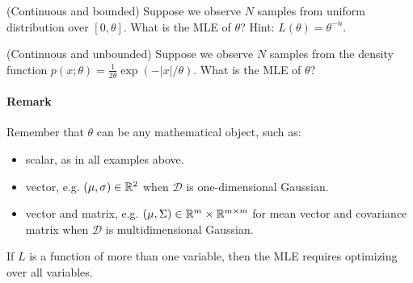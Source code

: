 \documentclass{discussion}
\begin{document}
\vspace{.5em}

\begin{exercise}(Continuous and bounded)
Suppose we observe $N$ samples from uniform distribution over $[0, \theta]$. What is the MLE of $\theta$?  Hint: $L(\theta) = \theta^{-n}$.
\end{exercise}

\vspace{.5em}

\begin{exercise}(Continuous and unbounded)
Suppose we observe $N$ samples from the density function $p(x;\theta) = \frac{1}{2\theta} \exp(-|x| / \theta).$ What is the MLE of $\theta$?
\end{exercise}

\paragraph{Remark} Remember that $\theta$ can be any mathematical object, such as:
\begin{itemize}
\item scalar, as in all examples above.
\item vector, e.g. $(\mu,\sigma) \in \mathbb{R}^2$ when $\mathcal{D}$ is one-dimensional Gaussian.
\item vector and matrix, e.g. $(\mu, \Sigma) \in \mathbb{R}^m \times \mathbb{R}^{m \times m}$ for mean vector and covariance matrix when $\mathcal{D}$ is multidimensional Gaussian.
\end{itemize}
If $L$ is a function of more than one variable, then the MLE requires optimizing over all variables.



\end{document}
